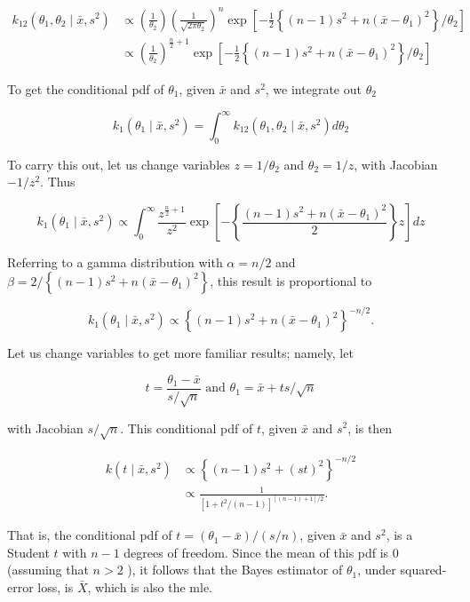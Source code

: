 $$
\begin{aligned}
k_{12}\left(\theta_{1}, \theta_{2} \mid \bar{x}, s^{2}\right) & \propto\left(\frac{1}{\theta_{2}}\right)\left(\frac{1}{\sqrt{2 \pi \theta_{2}}}\right)^{n} \exp \left[-\frac{1}{2}\left\{(n-1) s^{2}+n\left(\bar{x}-\theta_{1}\right)^{2}\right\} / \theta_{2}\right] \\
& \propto\left(\frac{1}{\theta_{2}}\right)^{\frac{n}{2}+1} \exp \left[-\frac{1}{2}\left\{(n-1) s^{2}+n\left(\bar{x}-\theta_{1}\right)^{2}\right\} / \theta_{2}\right]
\end{aligned}
$$

To get the conditional pdf of $\theta_{1}$, given $\bar{x}$ and $s^{2}$, we integrate out $\theta_{2}$

$$
k_{1}\left(\theta_{1} \mid \bar{x}, s^{2}\right)=\int_{0}^{\infty} k_{12}\left(\theta_{1}, \theta_{2} \mid \bar{x}, s^{2}\right) d \theta_{2}
$$

To carry this out, let us change variables $z=1 / \theta_{2}$ and $\theta_{2}=1 / z$, with Jacobian $-1 / z^{2}$. Thus

$$
k_{1}\left(\theta_{1} \mid \bar{x}, s^{2}\right) \propto \int_{0}^{\infty} \frac{z^{\frac{n}{2}+1}}{z^{2}} \exp \left[-\left\{\frac{(n-1) s^{2}+n\left(\bar{x}-\theta_{1}\right)^{2}}{2}\right\} z\right] d z
$$

Referring to a gamma distribution with $\alpha=n / 2$ and $\beta=2 /\left\{(n-1) s^{2}+n\left(\bar{x}-\theta_{1}\right)^{2}\right\}$, this result is proportional to

$$
k_{1}\left(\theta_{1} \mid \bar{x}, s^{2}\right) \propto\left\{(n-1) s^{2}+n\left(\bar{x}-\theta_{1}\right)^{2}\right\}^{-n / 2} .
$$

Let us change variables to get more familiar results; namely, let

$$
t=\frac{\theta_{1}-\bar{x}}{s / \sqrt{n}} \text { and } \theta_{1}=\bar{x}+t s / \sqrt{n}
$$

with Jacobian $s / \sqrt{n}$. This conditional pdf of $t$, given $\bar{x}$ and $s^{2}$, is then

$$
\begin{aligned}
k\left(t \mid \bar{x}, s^{2}\right) & \propto\left\{(n-1) s^{2}+(s t)^{2}\right\}^{-n / 2} \\
& \propto \frac{1}{\left[1+t^{2} /(n-1)\right]^{[(n-1)+1] / 2}} .
\end{aligned}
$$

That is, the conditional pdf of $t=\left(\theta_{1}-\bar{x}\right) /(s / n)$, given $\bar{x}$ and $s^{2}$, is a Student $t$ with $n-1$ degrees of freedom. Since the mean of this pdf is 0 (assuming that $n>2$ ), it follows that the Bayes estimator of $\theta_{1}$, under squared-error loss, is $\bar{X}$, which is also the mle.

